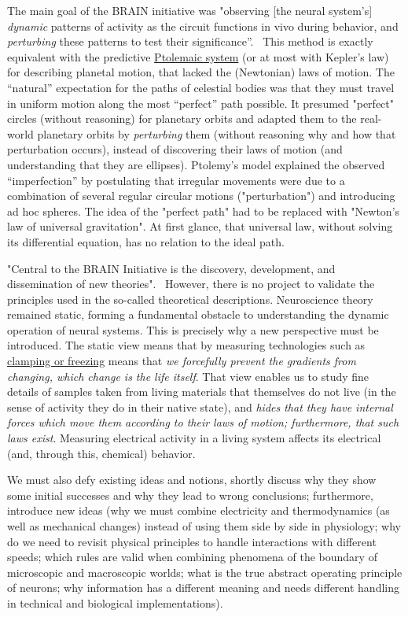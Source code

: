 The main goal of the BRAIN initiative was
"observing [the neural system's] \textit{dynamic} patterns of activity
as the circuit functions in vivo during behavior,
and \textit{perturbing} these patterns to test their significance”.~\cite{NIHBrainStrategy:2020}
This method is exactly equivalent with the predictive
\href{https://www.britannica.com/science/Ptolemaic-system}{Ptolemaic system}
(or at most with Kepler's law)
for describing planetal motion, that lacked the (Newtonian) laws of motion. The “natural” expectation for the paths of celestial bodies was that they must travel in uniform motion along the most “perfect” path possible.
It presumed "perfect" circles (without reasoning) for planetary orbits and adapted them to the real-world planetary orbits by \textit{perturbing} them (without reasoning why and how that perturbation occurs), instead of discovering their laws of motion (and understanding that they are ellipses).
Ptolemy’s model explained the observed “imperfection” by postulating that irregular movements were due to a combination of several regular circular motions ("perturbation")
and introducing ad hoc spheres.
The idea of the "perfect path" had to be replaced with "Newton's law of universal gravitation".
At first glance, that universal law, without solving its differential equation, has no relation to the ideal path.

"Central to the BRAIN Initiative is the discovery, development, and dissemination of new theories".~\cite{NIHBrainStrategy:2020} However, there is no project to validate 
the principles used in the so-called theoretical descriptions.
Neuroscience theory remained static, forming a fundamental obstacle to understanding the dynamic operation of neural systems.
%
This is precisely why a new perspective must be introduced. The static view
means that by measuring technologies such as \hyperlink{voltage-clamping}{clamping or freezing} means that 
\textit{we forcefully prevent the gradients from changing, which change is the 
life itself}. That view enables us to study fine details of samples taken from living materials that themselves do not live (in the sense of activity they do in their native state), and \textit{hides that they have internal forces which move them according to their laws of motion; furthermore, that such laws exist}. Measuring electrical activity in a living system affects its electrical (and, through this, chemical) behavior.


We must also defy existing ideas and notions, shortly discuss why they show some initial successes and why they lead to wrong conclusions; furthermore, introduce new ideas (why we must combine electricity and thermodynamics (as well as mechanical changes) instead of using them side by side in physiology; why do we need to revisit physical principles to handle interactions with different speeds; which rules are valid when combining phenomena of the boundary of microscopic and macroscopic worlds; what is the true abstract operating principle of neurons; why information has a different meaning and needs different handling in technical and biological implementations).

